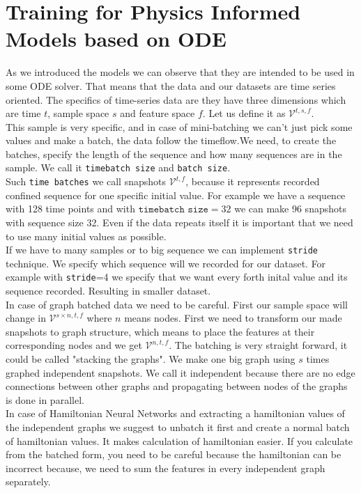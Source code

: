\section{Training for Physics Informed Models based on ODE}
As we introduced the models we can observe that they are intended to be used in some ODE solver. That means that the data and our datasets are time series oriented. The specifics of time-series data are they have three dimensions which are time $t$, sample space $s$ and feature space $f$. Let us define it as $\mathcal{V}^{t,s,f}$.\\
This sample is very specific, and in case of mini-batching we can't just pick some values and make a batch, the data follow the timeflow.We need, to create the batches, specify the length of the sequence and how many sequences are in the sample. We call it \texttt{timebatch size} and \texttt{batch size}.\\
Such \texttt{time batches} we call snapshots $\mathcal{V}^{t,f}$, because it represents recorded confined sequence for one specific initial value. For example we have a sequence with 128 time points and with $\texttt{timebatch size} = 32$ we can make 96 snapshots with sequence size 32. Even if the data repeats itself it is important that we need to use many initial values as possible.\\
If we have to many samples or to big sequence we can implement \texttt{stride} technique. We specify which sequence will we recorded for our dataset. For example with \texttt{stride}=4 we specify that we want every forth inital value and its sequence recorded. Resulting in smaller dataset.\\
In case of graph batched data we need to be careful. First our sample space will change in $\mathcal{V}^{s \times n,t,f}$ where  $n$ means nodes. First we need to transform our made snapshots to graph structure, which means to place the features at their corresponding nodes and we get $\mathcal{V}^{n,t,f}$. The batching is very straight forward, it could be called "stacking the graphs". We make one big graph using $s$ times graphed independent snapshots. We call it independent because there are no edge connections between other graphs and propagating between nodes of the graphs is done in parallel.\\
In case of Hamiltonian Neural Networks and extracting a hamiltonian values of the independent graphs we suggest to unbatch it first and create a normal batch of hamiltonian values. It makes calculation of hamiltonian easier. If you calculate from the batched form, you need to be careful because the  hamiltonian can be incorrect because, we need to sum the features in every  independent graph separately.      


